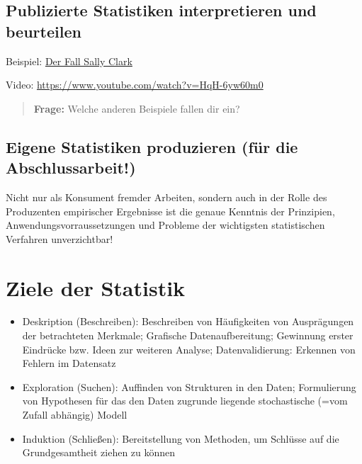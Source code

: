 \documentclass[
]{book}
\providecommand{\tightlist}{%
  \setlength{\itemsep}{0pt}\setlength{\parskip}{0pt}}
\begin{document}
\hypertarget{publizierte-statistiken-interpretieren-und-beurteilen}{%
\subsection{Publizierte Statistiken interpretieren und beurteilen}\label{publizierte-statistiken-interpretieren-und-beurteilen}}

Beispiel: \href{https://en.wikipedia.org/wiki/Sally_Clark}{Der Fall Sally Clark}

Video: \url{https://www.youtube.com/watch?v=HqH-6yw60m0}

\begin{quote}
\textbf{Frage:} Welche anderen Beispiele fallen dir ein?
\end{quote}

\hypertarget{eigene-statistiken-produzieren-fuxfcr-die-abschlussarbeit}{%
\subsection{Eigene Statistiken produzieren (für die Abschlussarbeit!)}\label{eigene-statistiken-produzieren-fuxfcr-die-abschlussarbeit}}

Nicht nur als Konsument fremder Arbeiten, sondern auch in der Rolle des Produzenten empirischer Ergebnisse ist die genaue Kenntnis der Prinzipien, Anwendungsvorraussetzungen und Probleme der wichtigsten statistischen Verfahren unverzichtbar!

\hypertarget{ziele-der-statistik}{%
\section{Ziele der Statistik}\label{ziele-der-statistik}}

\begin{itemize}
\tightlist
\item
  Deskription (Beschreiben): Beschreiben von Häufigkeiten von Ausprägungen der betrachteten Merkmale; Grafische Datenaufbereitung; Gewinnung erster Eindrücke bzw. Ideen zur weiteren Analyse; Datenvalidierung: Erkennen von Fehlern im Datensatz
\item
  Exploration (Suchen): Auffinden von Strukturen in den Daten; Formulierung von Hypothesen für das den Daten zugrunde liegende stochastische (=vom Zufall abhängig) Modell
\item
  Induktion (Schließen): Bereitstellung von Methoden, um Schlüsse auf die Grundgesamtheit ziehen zu können
\end{itemize}
\end{document}
